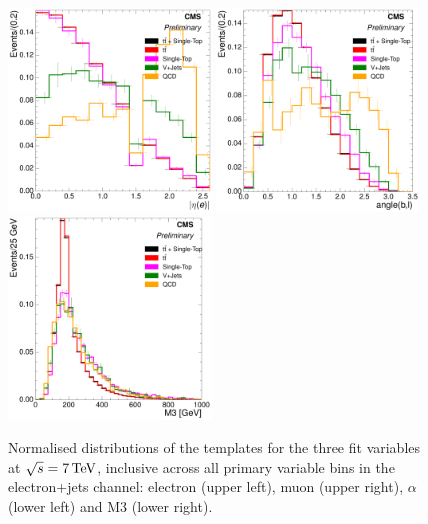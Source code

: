 \begin{figure}[hbtp]
    \centering
     \includegraphics[width=0.48\textwidth]{Chapters/04_Analysis/04b_XSections/images/7TeV/fit_variables/electron/MET/electron_absolute_eta/MET_inclusive_electron_absolute_eta_2orMoreBtags_templates.pdf}\hfill
     \includegraphics[width=0.48\textwidth]{Chapters/04_Analysis/04b_XSections/images/7TeV/fit_variables/electron/MET/angle_bl/MET_inclusive_angle_bl_2orMoreBtags_templates.pdf}\\
     \includegraphics[width=0.48\textwidth]{Chapters/04_Analysis/04b_XSections/images/7TeV/fit_variables/electron/MET/M3/MET_inclusive_M3_2orMoreBtags_templates.pdf}\\
	 \caption{Normalised distributions of the templates for the three fit variables at $\sqrt{s}=7\,\text{Te\hspace{-.08em}V}$,
	 inclusive across all primary variable bins in the electron+jets channel: electron \abseta (upper left), muon
	 \abseta (upper right), $\alpha$ (lower left) and M3 (lower right).}
     \label{fig:fit_variable_distributions_electron_7TeV}
\end{figure}

